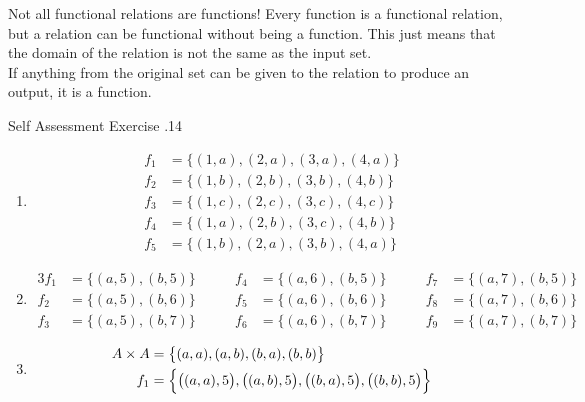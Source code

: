 \documentclass[\main/notes.tex]{subfiles}
\begin{document}
				\begin{sidenote}{Not all functional relations are functions!}
					Every function is a functional relation, but a relation can be functional without being a function. This just means that the domain of the relation is not the same as the input set.\\
					If anything from the original set can be given to the relation to produce an output, it is a function.
				\end{sidenote}
				\begin{exercise}{Self Assessment Exercise \thechapter.14}
					\begin{enumerate}
						\item {}
							\begin{align*}
								f_{1} &= \bigl\{(1, a), (2, a), (3, a), (4, a)\bigr\}\\
								f_{2} &= \bigl\{(1, b), (2, b), (3, b), (4, b)\bigr\}\\
								f_{3} &= \bigl\{(1, c), (2, c), (3, c), (4, c)\bigr\}\\
								f_{4} &= \bigl\{(1, a), (2, b), (3, c), (4, b)\bigr\}\\
								f_{5} &= \bigl\{(1, b), (2, a), (3, b), (4, a)\bigr\}
							\end{align*}
						\item {}
							\begin{alignat*}{3}
								f_{1} &= \bigl\{(a, 5), (b, 5)\bigr\} \qquad & f_{4} &= \bigl\{(a, 6), (b, 5)\bigr\} \qquad & f_{7} &= \bigl\{(a, 7), (b, 5)\bigr\}\\
								f_{2} &= \bigl\{(a, 5), (b, 6)\bigr\} \qquad & f_{5} &= \bigl\{(a, 6), (b, 6)\bigr\} \qquad & f_{8} &= \bigl\{(a, 7), (b, 6)\bigr\}\\
								f_{3} &= \bigl\{(a, 5), (b, 7)\bigr\} \qquad & f_{6} &= \bigl\{(a, 6), (b, 7)\bigr\} \qquad & f_{9} &= \bigl\{(a, 7), (b, 7)\bigr\}
							\end{alignat*}
						\item {}
							\begin{align*}
								A \times A &= \bigl\{(a, a), (a, b), (b, a), (b, b)\bigr\}\\
								f_{1} &= \Bigl\{\bigl((a, a), 5\bigr), \bigl((a, b), 5\bigr), \bigl((b, a), 5\bigr), \bigl((b, b), 5\bigr)\Bigr\}\\

\end{align*}
\end{enumerate}
\end{exercise}
\end{document}

